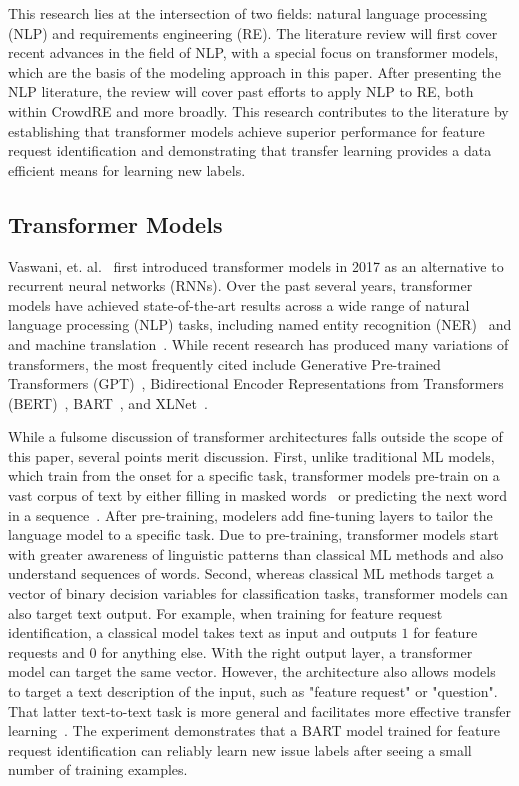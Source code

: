 This research lies at the intersection of two fields: natural language processing (NLP) and requirements engineering (RE). The literature review will first cover recent advances in the field of NLP, with a special focus on transformer models, which are the basis of the modeling approach in this paper. After presenting the NLP literature, the review will cover past efforts to apply NLP to RE, both within CrowdRE and more broadly. This research contributes to the literature by establishing that transformer models achieve superior performance for feature request identification and demonstrating that transfer learning provides a data efficient means for learning new labels.

\subsection{Transformer Models}
\label{xformer}

Vaswani, et. al.~\cite{vaswani} first introduced transformer models in 2017 as an alternative to recurrent neural networks (RNNs). Over the past several years, transformer models have achieved state-of-the-art results across a wide range of natural language processing (NLP) tasks, including named entity recognition (NER)~\cite{yamada} and and machine translation~\cite{edunov}. While recent research has produced many variations of transformers, the most frequently cited include Generative Pre-trained Transformers (GPT)~\cite{gpt}, Bidirectional Encoder Representations from Transformers (BERT)~\cite{bert}, BART~\cite{bart}, and XLNet~\cite{xlnet}.

While a fulsome discussion of transformer architectures falls outside the scope of this paper, several points merit discussion. First, unlike traditional ML models, which train from the onset for a specific task, transformer models pre-train on a vast corpus of text by either filling in masked words~\cite{bert, xlnet} or predicting the next word in a sequence~\cite{bart, gpt}. After pre-training, modelers add fine-tuning layers to tailor the language model to a specific task. Due to pre-training, transformer models start with greater awareness of linguistic patterns than classical ML methods and also understand sequences of words. Second, whereas classical ML methods target a vector of binary decision variables for classification tasks, transformer models can also target text output. For example, when training for feature request identification, a classical model takes text as input and outputs $1$ for feature requests and $0$ for anything else. With the right output layer, a transformer model can target the same vector. However, the architecture also allows models to target a text description of the input, such as "feature request" or "question". That latter text-to-text task is more general and facilitates more effective transfer learning~\cite{pan}. The experiment demonstrates that a BART model trained for feature request identification can reliably learn new issue labels after seeing a small number of training examples.

